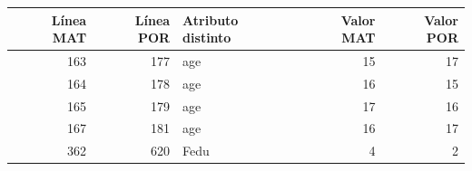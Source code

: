 \begin{tabular}{rrlrr}
\toprule
Línea MAT & Línea POR & Atributo distinto & Valor MAT & Valor POR \\
\midrule
163 & 177 & age & 15 & 17 \\
164 & 178 & age & 16 & 15 \\
165 & 179 & age & 17 & 16 \\
167 & 181 & age & 16 & 17 \\
362 & 620 & Fedu & 4 & 2 \\
\bottomrule
\end{tabular}
